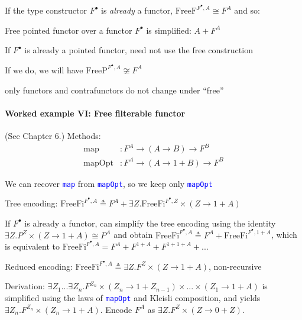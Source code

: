 If the type constructor $F^{\bullet}$ is \emph{already} a functor,
$\text{FreeF}^{F^{\bullet},A}\cong F^{A}$ and so:

Free pointed functor over a functor $F^{\bullet}$ is simplified:
$A+F^{A}$

If $F^{\bullet}$ is already a pointed functor, need not use the free
construction

If we do, we will have $\text{FreeP}^{F^{\bullet},A}\not\cong F^{A}$ 

only functors and contrafunctors do not change under \textsf{``}free\textsf{''}


\paragraph{Worked example VI: Free filterable functor}

(See Chapter 6.) Methods:
\begin{align*}
\text{map} & :F^{A}\rightarrow\left(A\rightarrow B\right)\rightarrow F^{B}\\
\text{mapOpt} & :F^{A}\rightarrow\left(A\rightarrow1+B\right)\rightarrow F^{B}
\end{align*}

We can recover \texttt{\textcolor{blue}{\footnotesize{}map}} from
\texttt{\textcolor{blue}{\footnotesize{}mapOpt}}, so we keep only
\texttt{\textcolor{blue}{\footnotesize{}mapOpt}} 

Tree encoding: $\text{FreeFi}^{F^{\bullet},A}\triangleq F^{A}+\exists Z.\text{FreeFi}^{F^{\bullet},Z}\times\left(Z\rightarrow1+A\right)$

If $F^{\bullet}$ is already a functor, can simplify the tree encoding
using the identity $\exists Z.P^{Z}\times\left(Z\rightarrow1+A\right)\cong P^{A}$
and obtain $\text{FreeFi}^{F^{\bullet},A}\triangleq F^{A}+\text{FreeFi}^{F^{\bullet},1+A}$,
which is equivalent to $\text{FreeFi}^{F^{\bullet},A}=F^{A}+F^{1+A}+F^{1+1+A}+...$

Reduced encoding: $\text{FreeFi}^{F^{\bullet},A}\triangleq\exists Z.F^{Z}\times\left(Z\rightarrow1+A\right)$,
non-recursive

Derivation: $\exists Z_{1}...\exists Z_{n}.F^{Z_{n}}\times\left(Z_{n}\rightarrow1+Z_{n-1}\right)\times...\times\left(Z_{1}\rightarrow1+A\right)$
is simplified using the laws of \texttt{\textcolor{blue}{\footnotesize{}mapOpt}}
and Kleisli composition, and yields $\exists Z_{n}.F^{Z_{n}}\times\left(Z_{n}\rightarrow1+A\right)$.
Encode $F^{A}$ as $\exists Z.F^{Z}\times\left(Z\rightarrow0+Z\right)$.

